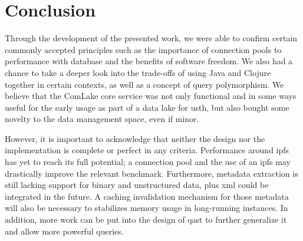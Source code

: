 \chapter{Conclusion}
Through the development of the presented work, we were able to confirm
certain commonly accepted principles such as the importance of connection pools
to performance with database and the benefits of software freedom.  We also
had a chance to take a deeper look into the trade-offs of using Java and Clojure
together in certain contexts, as well as a concept of query polymorphism.
We believe that the ComLake core service was not only functional and in
some ways useful for the early usage as part of a data lake for \gls{usth},
but also bought some novelty to the data management space, even if minor.

However, it is important to acknowledge that neither the design
nor the implementation is complete or perfect in any criteria.  Performance
around \gls{ipfs} has yet to reach its full potential; a connection pool
and the use of an \gls{ipfs} may drastically improve the relevant benchmark.
Furthermore, metadata extraction is still lacking support for binary
and unstructured data, plus \gls{xml} could be integrated in the future.
A caching invalidation mechanism for those metadata will also be necessary
to stabilizes memory usage in long-running instances.  In addition,
more work can be put into the design of \gls{qast} to further generalize it
and allow more powerful queries.
